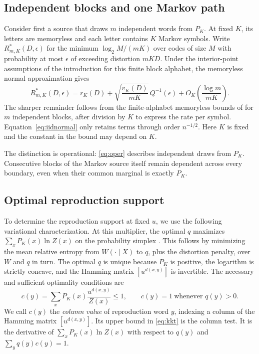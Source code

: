 \documentclass[11pt,letterpaper]{article}
\theoremstyle{definition}
\begin{document}
\subsection{Independent blocks and one Markov path}
Consider first a source that draws $m$ independent words from $P_K$. At fixed $K$, its letters are memoryless and each letter contains $K$ Markov symbols. Write $R^*_{m,K}(D,\epsilon)$ for the minimum $\log_2 M/(mK)$ over codes of size $M$ with probability at most $\epsilon$ of exceeding distortion $mKD$. Under the interior-point assumptions of the introduction for this finite block alphabet, the memoryless normal approximation gives \cite{kv}
\begin{equation}
 R^*_{m,K}(D,\epsilon)=r_K(D)+\sqrt{\frac{v_K(D)}{mK}}\,Q^{-1}(\epsilon)
          +O_K\!\left(\frac{\log m}{mK}\right).                  \label{eq:oper}
\end{equation}
The sharper remainder follows from the finite-alphabet memoryless bounds of \cite{kv} for $m$ independent blocks, after division by $K$ to express the rate per symbol. Equation~\eqref{eq:iidnormal} only retains terms through order $n^{-1/2}$. Here $K$ is fixed and the constant in the bound may depend on $K$.

The distinction is operational: \eqref{eq:oper} describes independent draws from $P_K$. Consecutive blocks of the Markov source itself remain dependent across every boundary, even when their common marginal is exactly $P_K$.
\subsection{Optimal reproduction support}\label{sec:full}
To determine the reproduction support at fixed $u$, we use the following variational characterization. At this multiplier, the optimal $q$ maximizes $\sum_x P_K(x)\ln Z(x)$ on the probability simplex \cite{blahut}. This follows by minimizing the mean relative entropy from $W(\cdot\mid X)$ to $q$, plus the distortion penalty, over $W$ and $q$ in turn. The optimal $q$ is unique because $P_K$ is positive, the logarithm is strictly concave, and the Hamming matrix $[u^{d(x,y)}]$ is invertible. The necessary and sufficient optimality conditions are
\begin{equation}
 c(y)=\sum_x P_K(x)\frac{u^{d(x,y)}}{Z(x)}\le1,\qquad
 c(y)=1\ \text{whenever }q(y)>0.                                \label{eq:kkt}
\end{equation}
We call $c(y)$ the \emph{column value} of reproduction word $y$, indexing a column of the Hamming matrix $[u^{d(x,y)}]$. Its upper bound in \eqref{eq:kkt} is the column test. It is the derivative of $\sum_xP_K(x)\ln Z(x)$ with respect to $q(y)$ and $\sum_y q(y)c(y)=1$.
\end{document}
